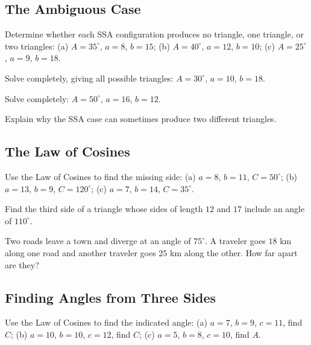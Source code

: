 \subsection*{The Ambiguous Case}
\begin{exercise}
Determine whether each SSA configuration produces no triangle, one
triangle, or two triangles: (a) $A=35^\circ$, $a=8$, $b=15$; (b)
$A=40^\circ$, $a=12$, $b=10$; (c) $A=25^\circ$, $a=9$, $b=18$.
\end{exercise}

\begin{exercise}
Solve completely, giving all possible triangles: $A = 30^\circ$, $a = 10$,
$b = 18$.
\end{exercise}

\begin{exercise}
Solve completely: $A = 50^\circ$, $a = 16$, $b = 12$.
\end{exercise}

\begin{exercise}
Explain why the SSA case can sometimes produce two different triangles.
\end{exercise}

\subsection*{The Law of Cosines}
\begin{exercise}
Use the Law of Cosines to find the missing side: (a) $a=8$, $b=11$,
$C=50^\circ$; (b) $a=13$, $b=9$, $C=120^\circ$; (c) $a=7$, $b=14$,
$C=35^\circ$.
\end{exercise}

\begin{exercise}
Find the third side of a triangle whose sides of length $12$ and $17$
include an angle of $110^\circ$.
\end{exercise}

\begin{exercise}
Two roads leave a town and diverge at an angle of $75^\circ$. A traveler
goes $18$ km along one road and another traveler goes $25$ km along the
other. How far apart are they?
\end{exercise}

\subsection*{Finding Angles from Three Sides}
\begin{exercise}
Use the Law of Cosines to find the indicated angle: (a) $a=7$, $b=9$,
$c=11$, find $C$; (b) $a=10$, $b=10$, $c=12$, find $C$; (c) $a=5$, $b=8$,
$c=10$, find $A$.
\end{exercise}

